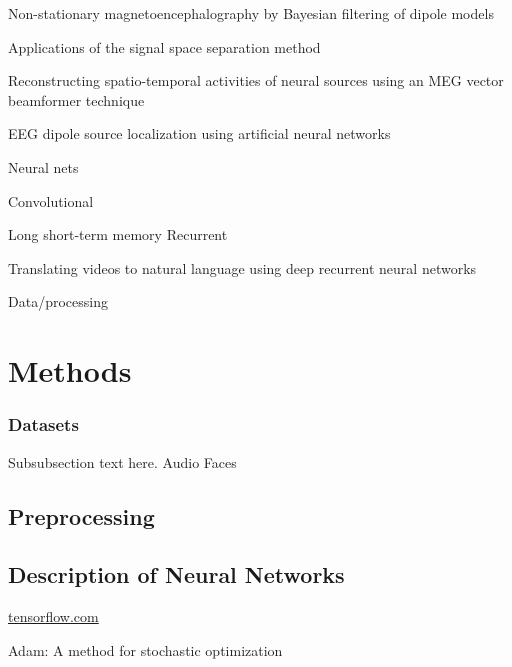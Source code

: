 \documentclass[journal]{IEEEtran}
\begin{document}
\cite{somersalo2003non}

Non-stationary magnetoencephalography by Bayesian filtering of dipole models

\cite{taulu2005applications}

Applications of the signal space separation method

\cite{sekihara2001reconstructing}

Reconstructing spatio-temporal activities of neural sources using an MEG vector beamformer technique


\cite{van2000eeg}

EEG dipole source localization using artificial neural networks

Neural nets

\cite{lecun1998gradient}

Convolutional


\cite{hochreiter1997long}

Long short-term memory
Recurrent

\cite{venugopalan2014translating}
Translating videos to natural language using deep recurrent neural networks


Data/processing
\cite{gramfort2013meg}

\section{Methods}
\subsubsection{Datasets}
\cite{gramfort2013meg}
Subsubsection text here.
Audio
Faces
\subsection{Preprocessing}
\subsection{Description of Neural Networks}
\url{tensorflow.com}
\cite{kingma2014adam}

Adam: A method for stochastic optimization
\end{document}
